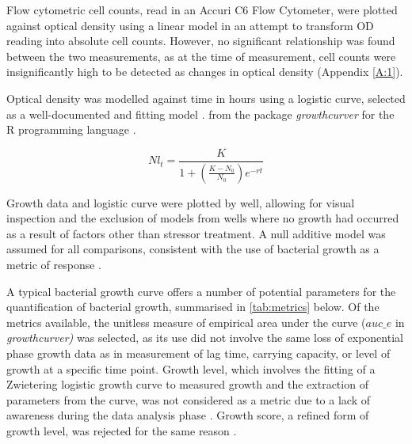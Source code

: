 \documentclass[final,1p,times]{elsarticle}
\begin{document}
Flow cytometric cell counts, read in an Accuri C6 Flow Cytometer, were plotted against optical density using a linear model in an attempt to transform OD reading into absolute cell counts. However, no significant relationship was found between the two measurements, as at the time of measurement, cell counts were insignificantly high to be detected as changes in optical density (Appendix \ref{A:1}). 

Optical density was modelled against time in hours using a logistic curve, selected as a well-documented and fitting model \cite{Zwietering1990}.  from the package \textit{growthcurver} \cite{Sprouffske2016Package} for the R programming language \cite{RCoreTeam2018}.

\begin{equation}
Nl_t=\frac{K}{1 + (\frac{K - N_0}{N_0}) e^{-rt}}
\label{E:log_curve}
\end{equation}

Growth data and logistic curve were plotted by well, allowing for visual inspection and the exclusion of models from wells where no growth had occurred as a result of factors other than stressor treatment. A null additive model was assumed for all comparisons, consistent with the use of bacterial growth as a metric of response \cite{Piggott2015}. 

A typical bacterial growth curve \cite{Monod1949} offers a number of potential parameters for the quantification of bacterial growth, summarised in \cref{tab:metrics} below. Of the metrics available, the unitless measure of empirical area under the curve ($auc\_e$ in \textit{growthcurver)} was selected, as its use did not involve the same loss of exponential phase growth data as in measurement of lag time, carrying capacity, or level of growth at a specific time point. Growth level, which involves the fitting of a Zwietering logistic growth curve to measured growth and the extraction of parameters from the curve, was not considered as a metric due to a lack of awareness during the data analysis phase \cite{Cuevas2017}. Growth score, a refined form of growth level, was rejected for the same reason \cite{Cuevas2018}.
\end{document}
